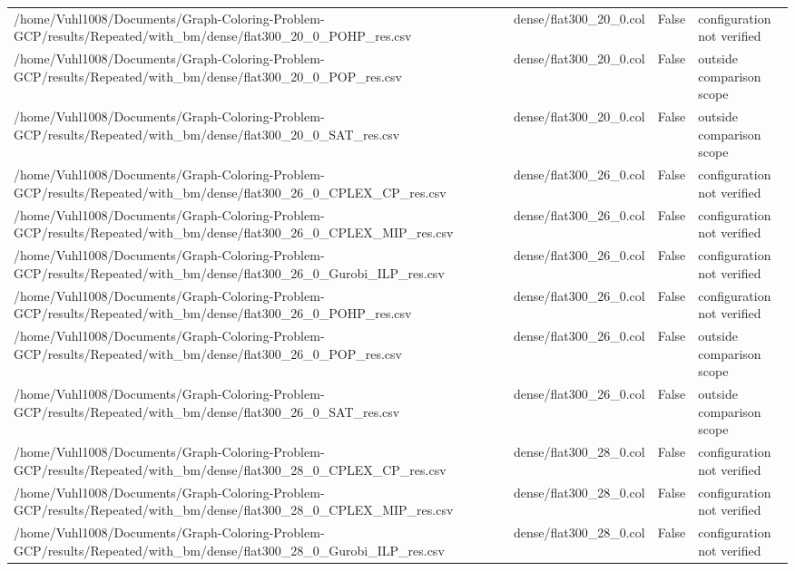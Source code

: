 \begin{table}[htbp]
\begin{tabular}{llll}
/home/Vuhl1008/Documents/Graph-Coloring-Problem-GCP/results/Repeated/with\_bm/dense/flat300\_20\_0\_POHP\_res.csv & dense/flat300\_20\_0.col & False & configuration not verified \\
/home/Vuhl1008/Documents/Graph-Coloring-Problem-GCP/results/Repeated/with\_bm/dense/flat300\_20\_0\_POP\_res.csv & dense/flat300\_20\_0.col & False & outside comparison scope \\
/home/Vuhl1008/Documents/Graph-Coloring-Problem-GCP/results/Repeated/with\_bm/dense/flat300\_20\_0\_SAT\_res.csv & dense/flat300\_20\_0.col & False & outside comparison scope \\
/home/Vuhl1008/Documents/Graph-Coloring-Problem-GCP/results/Repeated/with\_bm/dense/flat300\_26\_0\_CPLEX\_CP\_res.csv & dense/flat300\_26\_0.col & False & configuration not verified \\
/home/Vuhl1008/Documents/Graph-Coloring-Problem-GCP/results/Repeated/with\_bm/dense/flat300\_26\_0\_CPLEX\_MIP\_res.csv & dense/flat300\_26\_0.col & False & configuration not verified \\
/home/Vuhl1008/Documents/Graph-Coloring-Problem-GCP/results/Repeated/with\_bm/dense/flat300\_26\_0\_Gurobi\_ILP\_res.csv & dense/flat300\_26\_0.col & False & configuration not verified \\
/home/Vuhl1008/Documents/Graph-Coloring-Problem-GCP/results/Repeated/with\_bm/dense/flat300\_26\_0\_POHP\_res.csv & dense/flat300\_26\_0.col & False & configuration not verified \\
/home/Vuhl1008/Documents/Graph-Coloring-Problem-GCP/results/Repeated/with\_bm/dense/flat300\_26\_0\_POP\_res.csv & dense/flat300\_26\_0.col & False & outside comparison scope \\
/home/Vuhl1008/Documents/Graph-Coloring-Problem-GCP/results/Repeated/with\_bm/dense/flat300\_26\_0\_SAT\_res.csv & dense/flat300\_26\_0.col & False & outside comparison scope \\
/home/Vuhl1008/Documents/Graph-Coloring-Problem-GCP/results/Repeated/with\_bm/dense/flat300\_28\_0\_CPLEX\_CP\_res.csv & dense/flat300\_28\_0.col & False & configuration not verified \\
/home/Vuhl1008/Documents/Graph-Coloring-Problem-GCP/results/Repeated/with\_bm/dense/flat300\_28\_0\_CPLEX\_MIP\_res.csv & dense/flat300\_28\_0.col & False & configuration not verified \\
/home/Vuhl1008/Documents/Graph-Coloring-Problem-GCP/results/Repeated/with\_bm/dense/flat300\_28\_0\_Gurobi\_ILP\_res.csv & dense/flat300\_28\_0.col & False & configuration not verified \\

\end{tabular}
\end{table}
